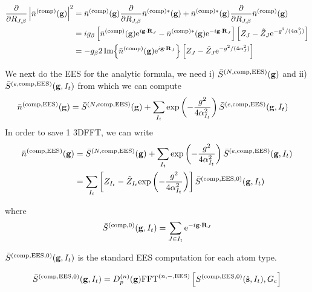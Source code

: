 \documentclass[paper=a4, fontsize=11pt]{article} %
\numberwithin{equation}{section} %
\numberwithin{figure}{section} %
\numberwithin{table}{section} %
\newcommand{\p}{\partial}
\newcommand{\bg}{{\bf{g}}}
\newcommand{\bR}{{\bf{R}}}
\newcommand{\hs}{{\hat{\bf{s}}}}
\newcommand{\rexp}{{\mathrm{exp}}}
\newcommand{\rEES}{{\mathrm{EES}}}
\newcommand{\re}{{\mathrm{e}}}
\newcommand{\rcomp}{{\mathrm{comp}}}
\newcommand{\ibgR}{i\bg\cdot\bR}
\newcommand{\al}{{\alpha}}
\newcommand{\RJb}{{R_{J,\beta}}}
\newcommand{\Gc}{{G_{\mathrm{c}}}}
\newcommand{\Dng}{{D^{(n)}_p(\bg)}}
\newcommand{\FFTniEES}{{\mathrm{FFT}^{(n,-,\rEES)}}}
\begin{document}
\begin{equation}
\begin{split}
\frac{\p}{\p \RJb}\left|\bar n ^{(\rcomp)}(\bg)\right|^2
&= \bar n ^{(\rcomp)}(\bg) \frac{\p}{\p \RJb}  \bar n ^{(\rcomp)*}(\bg) + \bar n ^{(\rcomp)*}(\bg) \frac{\p}{\p \RJb}  \bar n ^{(\rcomp)}(\bg) \\
&= ig_{\beta}\left[\bar n ^{(\rcomp)}(\bg) \re^{\ibgR_{J}} - \bar n ^{(\rcomp)*}(\bg)\re^{-\ibgR_{J}}\right]\left[Z_J - \tilde Z_J\re^{- g^2/(4\al_{J}^2)}\right] \\
&= -g_{\beta}2 \Im{\bar n ^{(\rcomp)}(\bg) \re^{\ibgR_{J}}}\left[Z_J - \tilde Z_J\re^{- g^2/(4\al_{J}^2)}\right] 
\end{split}
\end{equation}




We next do the EES for the analytic formula, we need i) $\bar S^{(N,\rcomp,\rEES)}(\bg)
$ and ii) $\bar S^{(e,\rcomp,\rEES)}(\bg,I_t)$ from which we can compute
\begin{equation}
\begin{split}
\bar n ^{(\rcomp,\rEES)}(\bg)
&= \bar S^{(N,\rcomp,\rEES)}(\bg) + \sum_{I_t}\rexp\left(-\frac{g^2}{4\al_{I_t}^2}\right)\bar S^{(e,\rcomp,\rEES)}(\bg,I_t)
\end{split}
\end{equation}
In order to save 1 3DFFT, we can write 
\begin{equation}
\begin{split}
\bar n ^{(\rcomp,\rEES)}(\bg)
&= \bar S^{(N,\rcomp,\rEES)}(\bg) + \sum_{I_t}\rexp\left(-\frac{g^2}{4\al_{I_t}^2}\right)\bar S^{(e,\rcomp,\rEES)}(\bg,I_t)\\
&= \sum_{I_t} \left[Z_{I_t} - \tilde{Z}_{I_t} \rexp\left(-\frac{g^2}{4\al_{I_t}^2}\right)\right] \bar S^{(\rcomp,\rEES,0)}(\bg,I_t)
\end{split}
\end{equation}

where 
\begin{equation}
\bar S^{(\rcomp,0)}(\bg,I_t) = \sum_{J \in I_t} \re^{-\ibgR_J }
\end{equation}

$\bar S^{(\rcomp,\rEES,0)}(\bg,I_t)$ is the standard EES computation for each atom type.

\begin{equation}
\begin{split}
\bar S^{(\rcomp,\rEES,0)}(\bg,I_t)
 &= \Dng \FFTniEES \left[ S^{(\rcomp,\rEES,0)}(\hs,I_t), \Gc \right]\\
\end{split}
\end{equation}
\end{document}
